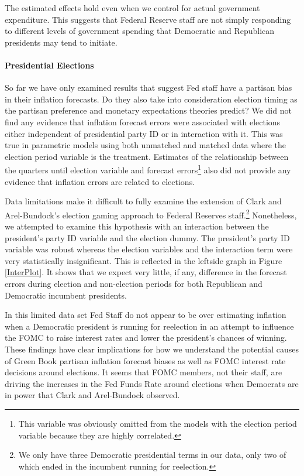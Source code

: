 \documentclass[a4paper]{article}\usepackage{graphicx, color}
\begin{document}
The estimated effects hold even when we control for actual government expenditure. This suggests that Federal Reserve staff are not simply responding to different levels of government spending that Democratic and Republican presidents may tend to initiate.

\paragraph{Presidential Elections}

So far we have only examined results that suggest Fed staff have a partisan bias in their inflation forecasts. Do they also take into consideration election timing as the partisan preference and monetary expectations theories predict? We did not find any evidence that inflation forecast errors were associated with elections either independent of presidential party ID or in interaction with it. This was true in parametric models using both unmatched and matched data where the election period variable is the treatment. Estimates of the relationship between the quarters until election variable and forecast errors\footnote{This variable was obviously omitted from the models with the election period variable because they are highly correlated.} also did not provide any evidence that inflation errors are related to elections. 

Data limitations make it difficult to fully examine the extension of Clark and Arel-Bundock's \citeyearpar{Clark2011} election gaming approach to Federal Reserves staff.\footnote{We only have three Democratic presidential terms in our data, only two of which ended in the incumbent running for reelection.} Nonetheless, we attempted to examine this hypothesis with an interaction between the president's party ID variable and the election dummy. The president's party ID variable was robust whereas the election variables and the interaction term were very statistically insignificant. This is reflected in the leftside graph in Figure \ref{InterPlot}. It shows that we expect very little, if any, difference in the forecast errors during election and non-election periods for both Republican and Democratic incumbent presidents. 

In this limited data set Fed Staff do not appear to be over estimating inflation when a Democratic president is running for reelection in an attempt to influence the FOMC to raise interest rates and lower the president's chances of winning. These findings have clear implications for how we understand the potential causes of Green Book partisan inflation forecast biases as well as FOMC interest rate decisions around elections. It seems that FOMC members, not their staff, are driving the increases in the Fed Funds Rate around elections when Democrats are in power that Clark and Arel-Bundock observed. 
\end{document}
